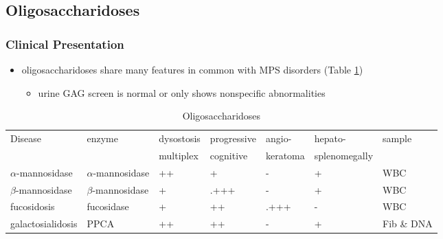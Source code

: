 \documentclass[12pt]{scrartcl}
\begin{document}
\subsection{Oligosaccharidoses}
\label{sec:org37cb367}
\subsubsection{Clinical Presentation}
\label{sec:org3a3bbe3}
\begin{itemize}
\item oligosaccharidoses share many features in common with MPS disorders (Table \ref{tab:org1309b8c})
\begin{itemize}
\item urine GAG screen is normal or only shows nonspecific
abnormalities
\end{itemize}
\end{itemize}

\begin{table}[htbp]
\caption{\label{tab:org1309b8c}Oligosaccharidoses}
\centering
\begin{tabular}{lllllll}
Disease & enzyme & dysostosis & progressive & angio- & hepato- & sample\\
 &  & multiplex & cognitive & keratoma & splenomegally & \\
\hline
\(\alpha\)-mannosidase & \(\alpha\)-mannosidase & ++ & + & - & + & WBC\\
\(\beta\)-mannosidase & \(\beta\)-mannosidase & + & .+++ & - & + & WBC\\
fucosidosis & fucosidase & + & ++ & .+++ & - & WBC\\
galactosialidosis & PPCA & ++ & ++ & - & + & Fib \& DNA\\
\end{tabular}
\end{table}
\end{document}
